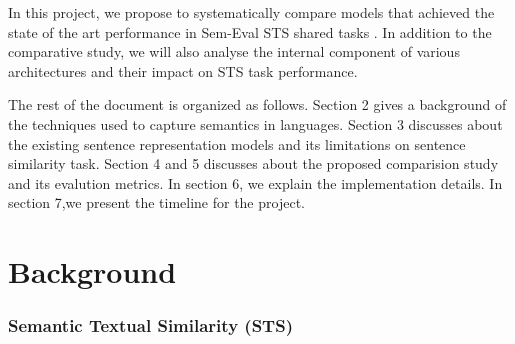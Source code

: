 \documentclass[12pt]{report} %
\begin{document}
	
	 In this project, we propose to systematically compare models that achieved the state of the art performance in Sem-Eval STS shared tasks \citep{cer2017semeval}.  In addition to the comparative study, we will also analyse the internal component of various architectures and their impact on STS task performance.
	 
	 The rest of the document is organized as follows. Section 2 gives a background of the techniques used to capture semantics in languages. Section 3 discusses about the existing sentence representation models and its limitations on sentence similarity task. Section 4 and 5 discusses about the proposed comparision study and its evalution metrics. In section 6, we explain the implementation details. In section 7,we present the timeline for the project.
	
	
	

\chapter{Background}
\subsection{Semantic Textual Similarity (STS)}
\end{document}
